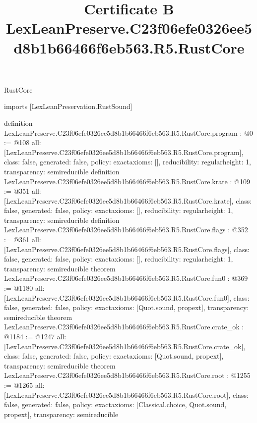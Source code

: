 \begin{lexlean}{RustCore}
\title{Certificate B LexLeanPreserve.C23f06efe0326ee5d8b1b66466f6eb563.R5.RustCore}
\begin{coremodule}
imports [LexLeanPreservation.RustSound]

definition LexLeanPreserve.C23f06efe0326ee5d8b1b66466f6eb563.R5.RustCore.program : @0 := @108 {
  all: [LexLeanPreserve.C23f06efe0326ee5d8b1b66466f6eb563.R5.RustCore.program],
  class: false,
  generated: false,
  policy: exact{axioms: []},
  reducibility: regular{height: 1},
  transparency: semireducible
}
definition LexLeanPreserve.C23f06efe0326ee5d8b1b66466f6eb563.R5.RustCore.krate : @109 := @351 {
  all: [LexLeanPreserve.C23f06efe0326ee5d8b1b66466f6eb563.R5.RustCore.krate],
  class: false,
  generated: false,
  policy: exact{axioms: []},
  reducibility: regular{height: 1},
  transparency: semireducible
}
definition LexLeanPreserve.C23f06efe0326ee5d8b1b66466f6eb563.R5.RustCore.flags : @352 := @361 {
  all: [LexLeanPreserve.C23f06efe0326ee5d8b1b66466f6eb563.R5.RustCore.flags],
  class: false,
  generated: false,
  policy: exact{axioms: []},
  reducibility: regular{height: 1},
  transparency: semireducible
}
theorem LexLeanPreserve.C23f06efe0326ee5d8b1b66466f6eb563.R5.RustCore.fun0 : @369 := @1180 {
  all: [LexLeanPreserve.C23f06efe0326ee5d8b1b66466f6eb563.R5.RustCore.fun0],
  class: false,
  generated: false,
  policy: exact{axioms: [Quot.sound, propext]},
  transparency: semireducible
}
theorem LexLeanPreserve.C23f06efe0326ee5d8b1b66466f6eb563.R5.RustCore.crate_ok : @1184 := @1247 {
  all: [LexLeanPreserve.C23f06efe0326ee5d8b1b66466f6eb563.R5.RustCore.crate_ok],
  class: false,
  generated: false,
  policy: exact{axioms: [Quot.sound, propext]},
  transparency: semireducible
}
theorem LexLeanPreserve.C23f06efe0326ee5d8b1b66466f6eb563.R5.RustCore.root : @1255 := @1265 {
  all: [LexLeanPreserve.C23f06efe0326ee5d8b1b66466f6eb563.R5.RustCore.root],
  class: false,
  generated: false,
  policy: exact{axioms: [Classical.choice, Quot.sound, propext]},
  transparency: semireducible
}


\end{coremodule}
\end{lexlean}
